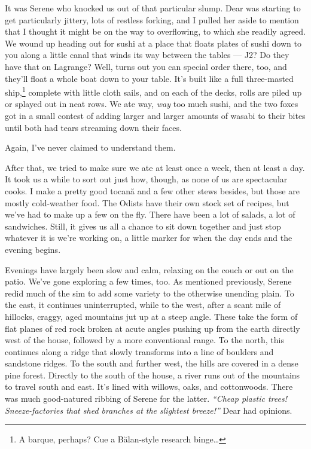 It was Serene who knocked us out of that particular slump. Dear was starting to get particularly jittery, lots of restless forking, and I pulled her aside to mention that I thought it might be on the way to overflowing, to which she readily agreed. We wound up heading out for sushi at a place that floats plates of sushi down to you along a little canal that winds its way between the tables — J2? Do they have that on Lagrange? Well, turns out you can special order there, too, and they'll float a whole boat down to your table. It's built like a full three-masted ship,\footnote{A barque, perhaps? Cue a Bălan-style research binge\ldots{}} complete with little cloth sails, and on each of the decks, rolls are piled up or splayed out in neat rows. We ate way, \emph{way} too much sushi, and the two foxes got in a small contest of adding larger and larger amounts of wasabi to their bites until both had tears streaming down their faces.

Again, I've never claimed to understand them.

After that, we tried to make sure we ate at least once a week, then at least a day. It took us a while to sort out just how, though, as none of us are spectacular cooks. I make a pretty good tocană and a few other stews besides, but those are mostly cold-weather food. The Odists have their own stock set of recipes, but we've had to make up a few on the fly. There have been a lot of salads, a lot of sandwiches. Still, it gives us all a chance to sit down together and just stop whatever it is we're working on, a little marker for when the day ends and the evening begins.

Evenings have largely been slow and calm, relaxing on the couch or out on the patio. We've gone exploring a few times, too. As mentioned previously, Serene redid much of the sim to add some variety to the otherwise unending plain. To the east, it continues uninterrupted, while to the west, after a scant mile of hillocks, craggy, aged mountains jut up at a steep angle. These take the form of flat planes of red rock broken at acute angles pushing up from the earth directly west of the house, followed by a more conventional range. To the north, this continues along a ridge that slowly transforms into a line of boulders and sandstone ridges. To the south and further west, the hills are covered in a dense pine forest. Directly to the south of the house, a river runs out of the mountains to travel south and east. It's lined with willows, oaks, and cottonwoods. There was much good-natured ribbing of Serene for the latter. \emph{``Cheap plastic trees! Sneeze-factories that shed branches at the slightest breeze!''} Dear had opinions.

